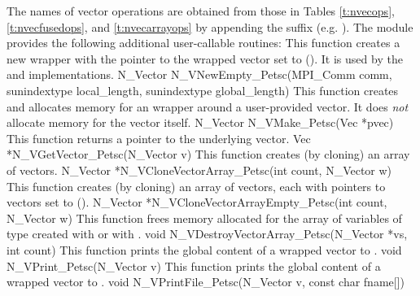 The names of vector operations are obtained from those in 
Tables \ref{t:nvecops}, \ref{t:nvecfusedops}, and \ref{t:nvecarrayops} by appending the
suffix  (e.g. ).
The module {\nvecpetsc}  provides the following additional user-callable routines:
{ 
  This function creates a new {\nvector} wrapper with the pointer to
  the wrapped {\petsc} vector set to (). It is used by the 
   and  implementations. 
}
{
  N\_Vector N\_VNewEmpty\_Petsc(MPI\_Comm comm, sunindextype local\_length, 
  sunindextype global\_length)
}
{  
  This function creates and allocates memory for an {\nvecpetsc}
  wrapper around a user-provided {\petsc} vector. It does {\em not} 
  allocate memory for the vector  itself.
}
{
  N\_Vector N\_VMake\_Petsc(Vec *pvec)
}
{  
  This function returns a pointer to the underlying {\petsc} vector.
}
{
  Vec *N\_VGetVector\_Petsc(N\_Vector v)
}
{ 
  This function creates (by cloning) an array of  {\nvecpetsc} vectors.
}
{
  N\_Vector *N\_VCloneVectorArray\_Petsc(int count, N\_Vector w)
}
{ 
  This function creates (by cloning) an array of  {\nvecpetsc} vectors,
  each with pointers to {\petsc} vectors set to ().
}
{
  N\_Vector *N\_VCloneVectorArrayEmpty\_Petsc(int count, N\_Vector w)
}
{
  This function frees memory allocated for the array of  variables of
  type  created with  or with
  .
}
{
  void N\_VDestroyVectorArray\_Petsc(N\_Vector *vs, int count)
}
{
  This function prints the global content of a wrapped {\petsc} vector to .
}
{
  void N\_VPrint\_Petsc(N\_Vector v)
}
{  
  This function prints the global content of a wrapped {\petsc} vector to .
}
{
  void N\_VPrintFile\_Petsc(N\_Vector v, const char fname[])
}

